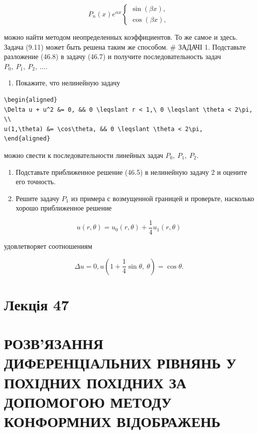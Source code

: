 \documentclass[
  ukrainian,
]{article}
\providecommand{\tightlist}{%
  \setlength{\itemsep}{0pt}\setlength{\parskip}{0pt}}
\begin{document}
\[
P_n(x) e^{\alpha x}
\begin{cases} \sin{(\beta x)}, \\ \cos{(\beta x)}, \end{cases}
\]

можно найти методом неопределенных коэффициентов. То же самое и здесь.
Задача (9.11) может быть решена таким же способом. \# ЗАДАЧІ 1.
Подставьте разложение (46.8) в задачу (46.7) и получите
последовательность задач \(P_0,\ P_1,\ P_2,\ \dots\).

\begin{enumerate}
\def\labelenumi{\arabic{enumi}.}
\setcounter{enumi}{1}
\tightlist
\item
  Покажите, что нелинейную задачу
\end{enumerate}

\begin{verbatim}
\begin{aligned}
\Delta u + u^2 &= 0, && 0 \leqslant r < 1,\ 0 \leqslant \theta < 2\pi, \\
u(1,\theta) &= \cos\theta, && 0 \leqslant \theta < 2\pi,
\end{aligned}
\end{verbatim}

можно свести к последовательности линейных задач \(P_0,\ P_1,\ P_2\).

\begin{enumerate}
\def\labelenumi{\arabic{enumi}.}
\setcounter{enumi}{2}
\item
  Подставьте приближенное решение (46.5) в нелинейную задачу 2 и оцените
  его точность.
\item
  Решите задачу \(P_1\) из примера с возмущенной границей и проверьте,
  насколько хорошо приближенное решение
\end{enumerate}

\[
u(r,\theta) = u_0(r,\theta) + \frac{1}{4}u_1(r,\theta)
\]

удовлетворяет соотношениям

\[
\Delta u = 0,
u\left(1 + \frac{1}{4}\sin\theta,\ \theta\right) = \cos\theta.
\]

\section{Лекція 47}\label{ux43bux435ux43aux446ux456ux44f-47}

\section{РОЗВ'ЯЗАННЯ ДИФЕРЕНЦІАЛЬНИХ РІВНЯНЬ У ПОХІДНИХ ПОХІДНИХ ЗА
ДОПОМОГОЮ МЕТОДУ КОНФОРМНИХ
ВІДОБРАЖЕНЬ}\label{ux440ux43eux437ux432ux44fux437ux430ux43dux43dux44f-ux434ux438ux444ux435ux440ux435ux43dux446ux456ux430ux43bux44cux43dux438ux445-ux440ux456ux432ux43dux44fux43dux44c-ux443-ux43fux43eux445ux456ux434ux43dux438ux445-ux43fux43eux445ux456ux434ux43dux438ux445-ux437ux430-ux434ux43eux43fux43eux43cux43eux433ux43eux44e-ux43cux435ux442ux43eux434ux443-ux43aux43eux43dux444ux43eux440ux43cux43dux438ux445-ux432ux456ux434ux43eux431ux440ux430ux436ux435ux43dux44c}
\end{document}
